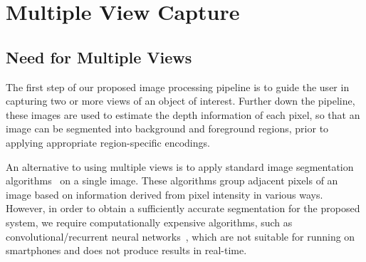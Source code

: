 



\section{Multiple View Capture}
\label{sec:mvcap}



\subsection{Need for Multiple Views}


The first step of our proposed image processing pipeline is to guide the user in capturing two or more views of an object of interest. Further down the pipeline, these images are used to estimate the depth information of each pixel, so that an image can be segmented into background and foreground regions, prior to applying appropriate region-specific encodings.

An alternative to using multiple views is to apply standard image segmentation algorithms~\cite{parvati2009image, otsu1975threshold, long2015fully, zheng2015conditional} on a single image. These algorithms group adjacent pixels of an image based on information derived from pixel intensity in various ways. However, in order to obtain a sufficiently accurate segmentation for the proposed system, we require computationally expensive algorithms, such as convolutional/recurrent neural networks~\cite{zheng2015conditional}, which are not suitable for running on smartphones and does not produce results in real-time.


